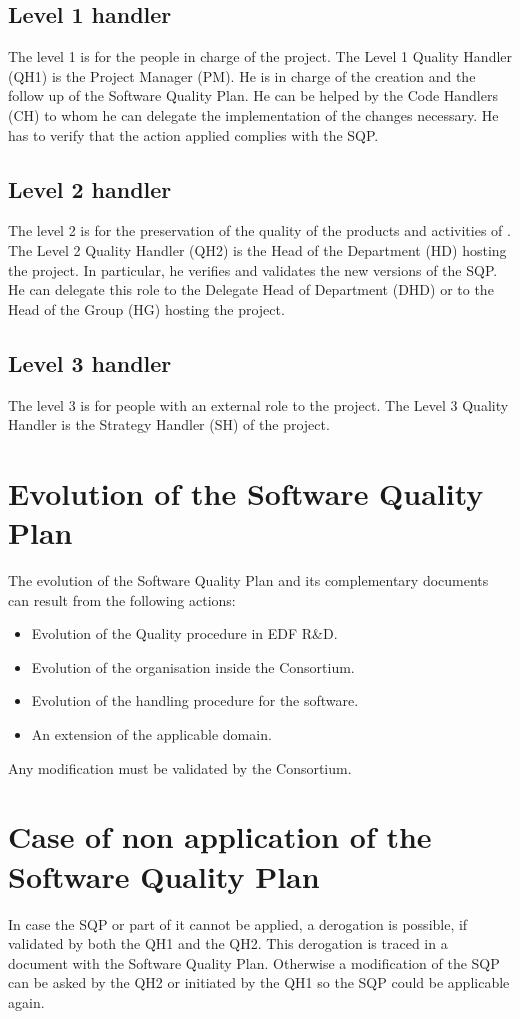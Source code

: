 \subsection{Level 1 handler}

The level 1 is for the people in charge of the project. The Level 1 Quality
Handler (QH1) is the \telemacsystem Project Manager (PM). He is in charge of the
creation and the follow up of the Software Quality Plan. He can be helped by
the Code Handlers (CH) to whom he can delegate the implementation of the
changes necessary. He has to verify that the action applied complies with the
SQP.

\subsection{Level 2 handler}

The level 2 is for the preservation of the quality of the products and
activities of \telemacsystem. The Level 2 Quality Handler (QH2) is the Head of the
Department (HD) hosting the \telemacsystem project. In particular, he verifies and
validates the new versions of the SQP. He can delegate this role to the Delegate
Head of Department (DHD) or to the Head of the Group (HG) hosting the \telemacsystem
project.

\subsection{Level 3 handler}

The level 3 is for people with an external role to the project. The Level 3
Quality Handler is the Strategy Handler (SH) of the \telemacsystem project.

\section{Evolution of the Software Quality Plan}

The evolution of the Software Quality Plan and its complementary documents can
result from the following actions:
\begin{itemize} 
\item Evolution of the Quality procedure in EDF R\&D.
\item Evolution of the organisation inside the Consortium.
\item Evolution of the handling procedure for the software.
\item An extension of the applicable domain.
\end{itemize}

Any modification must be validated by the Consortium.

\section{Case of non application of the Software Quality Plan}

In case the SQP or part of it cannot be applied, a derogation is possible, if
validated by both the QH1 and the QH2. This derogation is traced in a document
with the Software Quality Plan. Otherwise a modification of the SQP can be
asked by the QH2 or initiated by the QH1 so the SQP could be applicable again.

